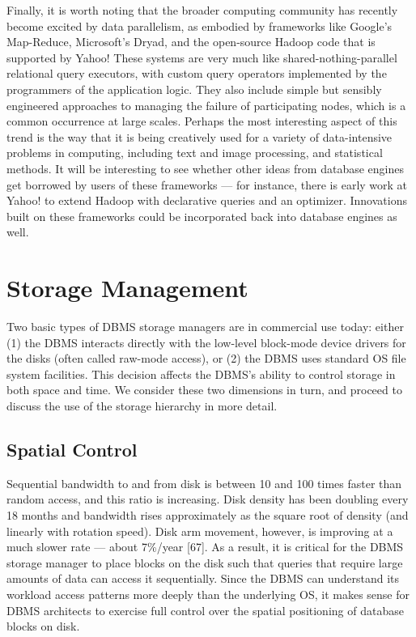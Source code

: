 \documentclass[b5paper,11pt,twoside,openright]{book}
\begin{document}
Finally, it is worth noting that the broader computing community has
recently become excited by data parallelism, as embodied by frameworks
like Google's Map-Reduce, Microsoft's Dryad, and the open-source Hadoop
code that is supported by Yahoo! These systems are very much like
shared-nothing-parallel relational query executors, with custom query
operators implemented by the programmers of the application logic. They
also include simple but sensibly engineered approaches to managing the
failure of participating nodes, which is a common occurrence at large
scales. Perhaps the most interesting aspect of this trend is the way
that it is being creatively used for a variety of data-intensive
problems in computing, including text and image processing, and
statistical methods. It will be interesting to see whether other ideas
from database engines get borrowed by users of these frameworks --- for
instance, there is early work at Yahoo! to extend Hadoop with
declarative queries and an optimizer. Innovations built on these
frameworks could be incorporated back into database engines as well.

\hypertarget{storage-management}{%
\chapter{Storage Management}\label{storage-management}}

Two basic types of DBMS storage managers are in commercial use today:
either (1) the DBMS interacts directly with the low-level block-mode
device drivers for the disks (often called raw-mode access), or (2) the
DBMS uses standard OS file system facilities. This decision affects the
DBMS's ability to control storage in both space and time. We consider
these two dimensions in turn, and proceed to discuss the use of the
storage hierarchy in more detail.

\hypertarget{spatial-control}{%
\section{Spatial Control}\label{spatial-control}}

Sequential bandwidth to and from disk is between 10 and 100 times faster
than random access, and this ratio is increasing. Disk density has been
doubling every 18 months and bandwidth rises approximately as the square
root of density (and linearly with rotation speed). Disk arm movement,
however, is improving at a much slower rate --- about 7\%/year {[}67{]}.
As a result, it is critical for the DBMS storage manager to place blocks
on the disk such that queries that require large amounts of data can
access it sequentially. Since the DBMS can understand its workload
access patterns more deeply than the underlying OS, it makes sense for
DBMS architects to exercise full control over the spatial positioning of
database blocks on disk.
\end{document}
